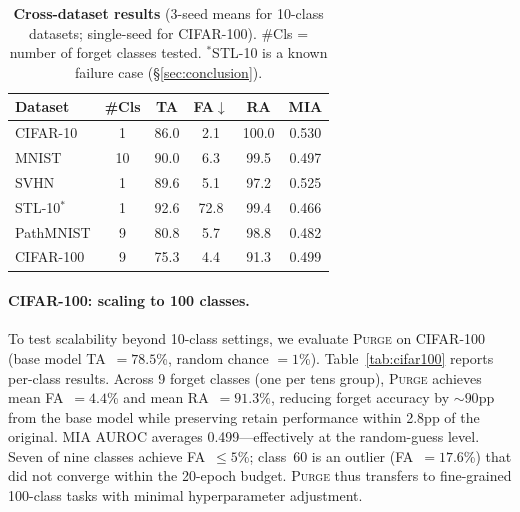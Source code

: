 \documentclass[letterpaper]{article} %
\newcommand{\ours}{\textsc{Purge}}
\begin{document}
\begin{table}[t]
\centering
\small
\setlength{\tabcolsep}{3.5pt}
\caption{\textbf{Cross-dataset results} (3-seed means for 10-class datasets; single-seed for CIFAR-100). \#Cls = number of forget classes tested. $^*$STL-10 is a known failure case (\S\ref{sec:conclusion}).}
\label{tab:cross}
\begin{tabular}{@{}lccccc@{}}
\toprule
\textbf{Dataset} & \textbf{\#Cls} & \textbf{TA} & \textbf{FA}$\downarrow$ & \textbf{RA} & \textbf{MIA} \\
\midrule
CIFAR-10 & 1 & 86.0 & 2.1 & 100.0 & 0.530 \\
MNIST & 10 & 90.0 & 6.3 & 99.5 & 0.497 \\
SVHN & 1 & 89.6 & 5.1 & 97.2 & 0.525 \\
STL-10$^*$ & 1 & 92.6 & 72.8 & 99.4 & 0.466 \\
PathMNIST & 9 & 80.8 & 5.7 & 98.8 & 0.482 \\
CIFAR-100 & 9 & 75.3 & 4.4 & 91.3 & 0.499 \\
\bottomrule
\end{tabular}
\end{table}

\paragraph{CIFAR-100: scaling to 100 classes.}
To test scalability beyond 10-class settings, we evaluate \ours{} on CIFAR-100 (base model TA~$= 78.5$\%, random chance $= 1$\%).
Table~\ref{tab:cifar100} reports per-class results.
Across 9 forget classes (one per tens group), \ours{} achieves mean FA~$= 4.4$\% and mean RA~$= 91.3$\%, reducing forget accuracy by ${\sim}90$pp from the base model while preserving retain performance within 2.8pp of the original.
MIA AUROC averages 0.499---effectively at the random-guess level.
Seven of nine classes achieve FA~$\le 5$\%; class~60 is an outlier (FA~$= 17.6$\%) that did not converge within the 20-epoch budget.
\ours{} thus transfers to fine-grained 100-class tasks with minimal hyperparameter adjustment.
\end{document}
